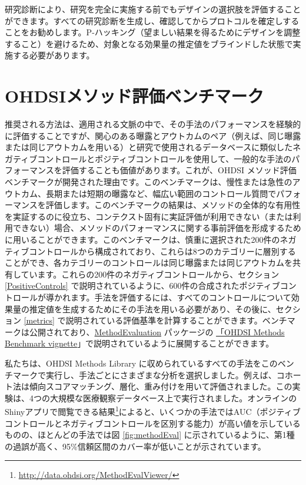 \documentclass[
  11pt]{book}
\makeatletter
\newenvironment{kframe}{%
\medskip{}
\setlength{\fboxsep}{.8em}
 \def\at@end@of@kframe{}%
 \ifinner\ifhmode%
  \def\at@end@of@kframe{\end{minipage}}%
  \begin{minipage}{\columnwidth}%
 \fi\fi%
 \def\FrameCommand##1{\hskip\@totalleftmargin \hskip-\fboxsep
 \colorbox{myShadeColor}{##1}\hskip-\fboxsep
     \hskip-\linewidth \hskip-\@totalleftmargin \hskip\columnwidth}%
 \MakeFramed {\advance\hsize-\width
   \@totalleftmargin\z@ \linewidth\hsize
   \@setminipage}}%
 {\par\unskip\endMakeFramed%
 \at@end@of@kframe}
\newenvironment{rmdblock}[1]
  {
  \begin{itemize}
  \renewcommand{\labelitemi}{
    \raisebox{-.7\height}[0pt][0pt]{
      {\setkeys{Gin}{width=3em,keepaspectratio}\texttt{[image: images/\#1]}}
    }
  }
  \setlength{\fboxsep}{1em}
  \begin{kframe}
  \item
  }
  {
  \end{kframe}
  \end{itemize}
  }
\newenvironment{rmdimportant}
  {\begin{rmdblock}{important}}
  {\end{rmdblock}}
\theoremstyle{definition}
\theoremstyle{definition}
\theoremstyle{definition}
\theoremstyle{definition}
\theoremstyle{remark}
\makeatother
\begin{document}
\begin{rmdimportant}
研究診断により、研究を完全に実施する前でもデザインの選択肢を評価することができます。すべての研究診断を生成し、確認してからプロトコルを確定しすることをお勧めします。P-ハッキング（望ましい結果を得るためにデザインを調整すること）を避けるため、対象となる効果量の推定値をブラインドした状態で実施する必要があります。
\end{rmdimportant}

\section{OHDSIメソッド評価ベンチマーク}\label{ohdsiux30e1ux30bdux30c3ux30c9ux8a55ux4fa1ux30d9ux30f3ux30c1ux30deux30fcux30af}


推奨される方法は、適用される文脈の中で、その手法のパフォーマンスを経験的に評価することですが、関心のある曝露とアウトカムのペア（例えば、同じ曝露または同じアウトカムを用いる）と研究で使用されるデータベースに類似したネガティブコントロールとポジティブコントロールを使用して、一般的な手法のパフォーマンスを評価することも価値があります。これが、OHDSI メソッド評価ベンチマークが開発された理由です。このベンチマークは、慢性または急性のアウトカム、長期または短期の曝露など、幅広い範囲のコントロール質問でパフォーマンスを評価します。このベンチマークの結果は、メソッドの全体的な有用性を実証するのに役立ち、コンテクスト固有に実証評価が利用できない（または利用できない）場合、メソッドのパフォーマンスに関する事前評価を形成するために用いることができます。このベンチマークは、慎重に選択された200件のネガティブコントロールから構成されており、これらは8つのカテゴリーに層別することができ、各カテゴリーのコントロールは同じ曝露または同じアウトカムを共有しています。これらの200件のネガティブコントロールから、セクション \ref{PositiveControls} で説明されているように、600件の合成されたポジティブコントロールが導かれます。手法を評価するには、すべてのコントロールについて効果量の推定値を生成するためにその手法を用いる必要があり、その後に、セクション \ref{metrics} で説明されている評価基準を計算することができます。ベンチマークは公開されており、\href{https://ohdsi.github.io/MethodEvaluation/}{MethodEvaluation} パッケージの \href{https://ohdsi.github.io/MethodEvaluation/articles/OhdsiMethodsBenchmark.html}{「OHDSI Methods Benchmark vignette}」で説明されているように展開することができます。

私たちは、OHDSI Methods Library に収められているすべての手法をこのベンチマークで実行し、手法ごとにさまざまな分析を選択しました。例えば、コホート法は傾向スコアマッチング、層化、重み付けを用いて評価されました。この実験は、4つの大規模な医療観察データベース上で実行されました。オンラインのShinyアプリで閲覧できる結果\footnote{\url{http://data.ohdsi.org/MethodEvalViewer/}}によると、いくつかの手法ではAUC（ポジティブコントロールとネガティブコントロールを区別する能力）が高い値を示しているものの、ほとんどの手法では図 \ref{fig:methodEval} に示されているように、第1種の過誤が高く、95\%信頼区間のカバー率が低いことが示されています。
\end{document}
